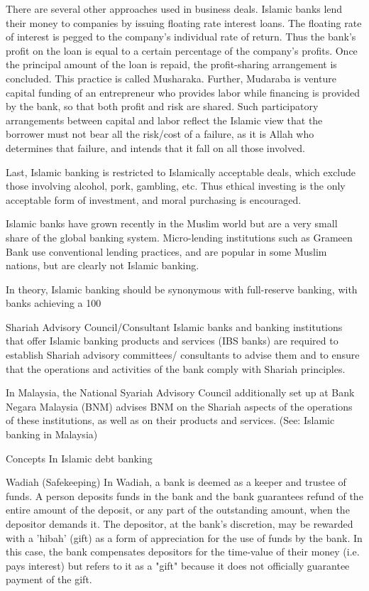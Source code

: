There are several other approaches used in business deals. Islamic banks lend their money to companies by issuing floating rate interest loans. The floating rate of interest is pegged to the company's individual rate of return. Thus the bank's profit on the loan is equal to a certain percentage of the company's profits. Once the principal amount of the loan is repaid, the profit-sharing arrangement is concluded. This practice is called Musharaka. Further, Mudaraba is venture capital funding of an entrepreneur who provides labor while financing is provided by the bank, so that both profit and risk are shared. Such participatory arrangements between capital and labor reflect the Islamic view that the borrower must not bear all the risk/cost of a failure, as it is Allah who determines that failure, and intends that it fall on all those involved.

Last, Islamic banking is restricted to Islamically acceptable deals, which exclude those involving alcohol, pork, gambling, etc. Thus ethical investing is the only acceptable form of investment, and moral purchasing is encouraged.

Islamic banks have grown recently in the Muslim world but are a very small share of the global banking system. Micro-lending institutions such as Grameen Bank use conventional lending practices, and are popular in some Muslim nations, but are clearly not Islamic banking.

In theory, Islamic banking should be synonymous with full-reserve banking, with banks achieving a 100%


Shariah Advisory Council/Consultant
Islamic banks and banking institutions that offer Islamic banking products and services (IBS banks) are required to establish Shariah advisory committees/ consultants to advise them and to ensure that the operations and activities of the bank comply with Shariah principles.

In Malaysia, the National Syariah Advisory Council additionally set up at Bank Negara Malaysia (BNM) advises BNM on the Shariah aspects of the operations of these institutions, as well as on their products and services. (See: Islamic banking in Malaysia)


Concepts In Islamic debt banking

Wadiah (Safekeeping)
In Wadiah, a bank is deemed as a keeper and trustee of funds. A person deposits funds in the bank and the bank guarantees refund of the entire amount of the deposit, or any part of the outstanding amount, when the depositor demands it. The depositor, at the bank's discretion, may be rewarded with a 'hibah' (gift) as a form of appreciation for the use of funds by the bank. In this case, the bank compensates depositors for the time-value of their money (i.e. pays interest) but refers to it as a "gift" because it does not officially guarantee payment of the gift.


